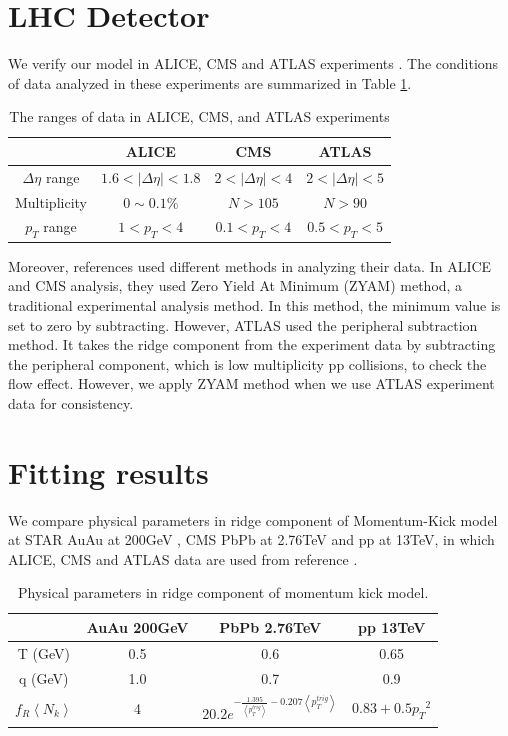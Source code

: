 \documentclass[jkps,fleqn,showpacs,showkeys]{revtex4-2}
\begin{document}
\section*{LHC Detector}
\label{sec:LHC Detector}

We verify our model in ALICE, CMS and ATLAS experiments \cite{alice,cms,atlas}. The conditions of data analyzed in these experiments are summarized in Table \ref{table:range}.

\begin{table}[h!]
  \centering
  \begin{tabular}{||c c c c||} 
   \hline
   & ALICE & CMS & ATLAS \\ [0.5ex] 
  \hline\hline
  $\Delta \eta $ range & $1.6<|\Delta \eta |<1.8$ & $2<|\Delta \eta |<4$ & $2<|\Delta \eta |<5$ \\ 
  Multiplicity & $0\sim0.1\%$ & $N>105$ & $N>90$ \\
  $p_T$ range & $1<p_T<4$ & $0.1<p_T<4$ & $0.5<p_T<5$ \\[1ex]
  \hline
 \end{tabular}
 \caption{The ranges of data in ALICE, CMS, and ATLAS experiments \cite{alice, cms, atlas}}
 \label{table:range}
\end{table}

Moreover, references \cite{alice, cms, atlas} used different methods in analyzing their data.
In ALICE and CMS analysis, they used Zero Yield At Minimum (ZYAM) method, a traditional experimental analysis method.
In this method, the minimum value is set to zero by subtracting.
However, ATLAS used the peripheral subtraction method.
It takes the ridge component from the experiment data by subtracting the peripheral component,
which is low multiplicity pp collisions, to check the flow effect.
However, we apply ZYAM method when we use ATLAS experiment data for consistency.

\section*{Fitting results}
\label{sec:Fitting results}


We compare physical parameters in ridge component of Momentum-Kick model at STAR AuAu at 200GeV \cite{Wong_1}, CMS PbPb at 2.76TeV \cite{PbPb}
and pp at 13TeV, in which ALICE, CMS and ATLAS data are used from reference \cite{alice, cms, atlas}.

\begin{table}[h!]
  \centering
  \begin{tabular}{||c c c c||} 
   \hline
    & AuAu 200GeV & PbPb 2.76TeV & pp 13TeV \\ [0.5ex] 
   \hline\hline
   T (GeV) & 0.5 & 0.6 & 0.65 \\
   q (GeV) & 1.0 & 0.7 & 0.9 \\ 
  $f_R \left\langle N_k \right\rangle$ & 4 & $20.2e^{-\frac{1.395}{\left\langle p_{T}^{trig} \right\rangle}-0.207{\left\langle p_{T}^{trig} \right\rangle}}$ & $0.83+0.5{p_T}^2$ \\[1ex]
   \hline
 \end{tabular}
 \caption{Physical parameters in ridge component of momentum kick model.}
 \label{table:param}
\end{table}
\end{document}
